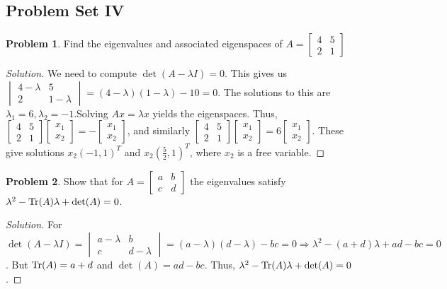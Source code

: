 \documentclass[oneside]{book}
\theoremstyle{definition}
\newtheorem{problem}{Problem}[section]
\begin{document}
\subsection*{Problem Set IV}

\begin{problem}
Find the eigenvalues and associated eigenspaces of $A = \begin{bmatrix}4 & 5 \\ 2 & 1 \end{bmatrix}$
\end{problem}
\begin{proof}[Solution]
We need to compute $\det(A-\lambda I)=0$. This gives us $\begin{vmatrix} 4-\lambda & 5 \\ 2 & 1-\lambda \end{vmatrix} = (4-\lambda)(1-\lambda)-10 = 0$. The solutions to this are $\lambda_1 = 6, \lambda_2 = -1$.Solving $Ax = \lambda x$ yields the eigenspaces. Thus, $\begin{bmatrix} 4 & 5 \\ 2 & 1 \end{bmatrix} \begin{bmatrix} x_1 \\ x_2 \end{bmatrix} = - \begin{bmatrix} x_1 \\ x_2 \end{bmatrix}$, and similarly $\begin{bmatrix} 4 & 5 \\ 2 & 1 \end{bmatrix} \begin{bmatrix} x_1 \\ x_2 \end{bmatrix} = 6\begin{bmatrix} x_1 \\ x_2 \end{bmatrix}$. These give solutions $x_2(-1,1)^T$ and $x_2 (\frac{5}{2},1)^T$, where $x_2$ is a free variable.
\end{proof}

\begin{problem}
Show that for $A=\begin{bmatrix} a & b \\ c & d \end{bmatrix}$ the eigenvalues satisfy $\lambda^2 - \Tr(A)\lambda + \det(A) = 0$.
\end{problem}
\begin{proof}[Solution]
For $\det(A-\lambda I) = \begin{vmatrix} a-\lambda & b \\ c & d-\lambda \end{vmatrix} = (a-\lambda)(d-\lambda) - bc = 0 \Rightarrow \lambda^2 - (a+d)\lambda + ad - bc = 0$. But $\Tr(A) = a+d$ and $\det(A) = ad-bc$. Thus, $\lambda^2 - \Tr(A) \lambda + \det(A) = 0$.
\end{proof}
\end{document}
